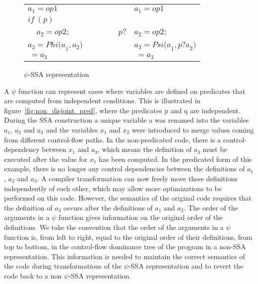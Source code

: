 \begin{figure}
\begin{center}
\footnotesize
\begin{tabular}{llll}
${a}_1 = {op1}$ & & & ${a}_1 = {op1}$ \\
${if\ (p)}$        & & & \\
$\ \ \ \ \ a_2 = {op2;}$ & \ \ \ \ \  & ${p?}$ & ${a}_2 = {op2;}$ \\
${a}_3 = {Phi(a}_1, {a}_2)$ & & & ${a}_3 = {Psi(a}_1, {p?a}_2)$ \\
${\ = a}_3$ & & & ${\ = a}_3$ \\
\end{tabular}
\caption{$\psi$-SSA representation}
\label{fig:op_pred}
\end{center}
\end{figure}

A $\psi$ function can represent cases where variables are defined on
predicates that are computed from independent conditions. This is
illustrated in figure~\ref{fig:non_disjoint_pred}, where the
predicates {p} and {q} are independent. During the SSA
construction a unique variable {a} was renamed into the variables
${a}_1$, ${a}_2$ and ${a}_3$ and the variables ${x}_1$
and ${x}_2$ were introduced to merge values coming from different
control-flow paths. In the non-predicated code, there is a
control-dependency between ${x}_1$ and ${a}_3$, which means
the definition of ${a_3}$ must be executed after the value for
${x_1}$ has been computed. In the predicated form of this example,
there is no longer any control dependencies between the definitions of
${a_1}$, ${a_2}$ and ${a_3}$. A compiler transformation
can now freely move these definitions independently of each other,
which may allow more optimizations to be performed on this
code. However, the semantics of the original code requires that the
definition of ${a_3}$ occurs after the definitions of ${a_1}$
and ${a_2}$. The order of the arguments in a $\psi$ function gives
information on the original order of the definitions. We take the
convention that the order of the arguments in a $\psi$ function is,
from left to right, equal to the original order of their definitions,
from top to bottom, in the control-flow dominance tree of the program
in a non-SSA representation. This information is needed to maintain
the correct semantics of the code during transformations of the
$\psi$-SSA representation and to revert the code back to a non
$\psi$-SSA representation.


